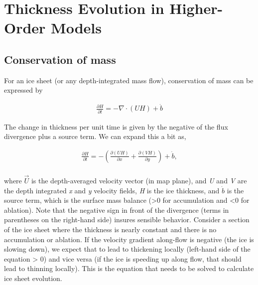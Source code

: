 %
%


%

\section{Thickness Evolution in Higher-Order Models}

\subsection{Conservation of mass}
For an ice sheet (or any depth-integrated mass flow), conservation of mass can be expressed by

\begin{align*}
\frac{\partial H}{\partial t}=-\nabla \cdot \left( UH \right)+\dot{b}
\end{align*}

The change in thickness per unit time is given by the negative of the flux divergence plus a source term. We can expand this a bit as,


\begin{align*}\frac{\partial H}{\partial t}=-\left( \frac{\partial \left( UH \right)}{\partial x}+\frac{\partial \left( VH \right)}{\partial y} \right)+\dot{b}, \\ 
\end{align*}

where $\vec{U}$ is the depth-averaged velocity vector (in map plane), and \textit{U} and \textit{V} are the depth integrated \textit{x} and \textit{y} velocity fields, \textit{H} is the ice thickness, and $\dot{b}$ is the source term, which is the surface mass balance (>0 for accumulation and <0 for ablation). Note that the negative sign in front of the divergence (terms in parentheses on the right-hand side) insures sensible behavior. Consider a section of the ice sheet where the thickness is nearly constant and there is no accumulation or ablation. If the velocity gradient along-flow is negative (the ice is slowing down), we expect that to lead to thickening locally (left-hand side of the equation > 0) and vice versa (if the ice is speeding up along flow, that should lead to thinning locally). This is the equation that needs to be solved to calculate ice sheet evolution.

